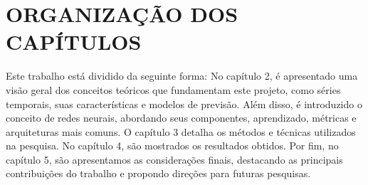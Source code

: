      

\section{ORGANIZAÇÃO DOS CAPÍTULOS}
    Este trabalho está dividido da seguinte forma: No capítulo 2, é apresentado uma visão geral dos conceitos teóricos que 
    fundamentam este projeto, como séries temporais, suas características e modelos de previsão. Além disso, é introduzido o 
    conceito de redes neurais, abordando seus componentes, aprendizado, métricas e arquiteturas mais comuns. O capítulo 3 
    detalha os métodos e técnicas utilizados na pesquisa. No capítulo 4, são mostrados os resultados obtidos. Por fim, no 
    capítulo 5, são apresentamos as considerações finais, destacando as principais contribuições do trabalho e propondo direções 
    para futuras pesquisas.